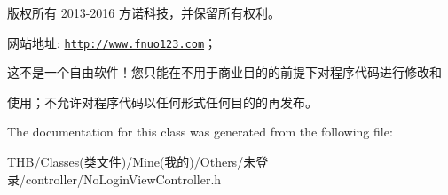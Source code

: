 版权所有 2013-\/2016 方诺科技，并保留所有权利。

网站地址\+: \href{http://www.fnuo123.com}{\tt http\+://www.\+fnuo123.\+com}； 



这不是一个自由软件！您只能在不用于商业目的的前提下对程序代码进行修改和

使用；不允许对程序代码以任何形式任何目的的再发布。 

 

The documentation for this class was generated from the following file\+:\begin{DoxyCompactItemize}
\item 
T\+H\+B/\+Classes(类文件)/\+Mine(我的)/\+Others/未登录/controller/No\+Login\+View\+Controller.\+h\end{DoxyCompactItemize}
